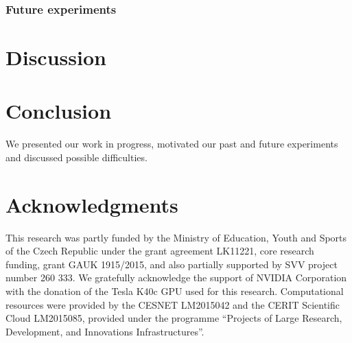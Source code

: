\documentclass[11pt]{article}
\begin{document}
\subsubsection*{Future experiments}




\section{Discussion}
\label{sec:discussion}


\section{Conclusion}
\label{sec:conclusion}
We presented our work in progress, motivated our past and future experiments and discussed possible difficulties.

\section*{Acknowledgments}
This research was partly funded by the Ministry of Education, Youth and Sports of the Czech Republic under the grant agreement LK11221, core research funding, grant GAUK 1915/2015, and also partially supported by SVV project number 260 333. 
We gratefully acknowledge the support of NVIDIA Corporation with the donation of the Tesla K40c GPU used for this research.
Computational resources were provided by the CESNET LM2015042 and the CERIT Scientific Cloud LM2015085, provided under the programme ``Projects of Large Research, Development, and Innovations Infrastructures''.



\end{document}
